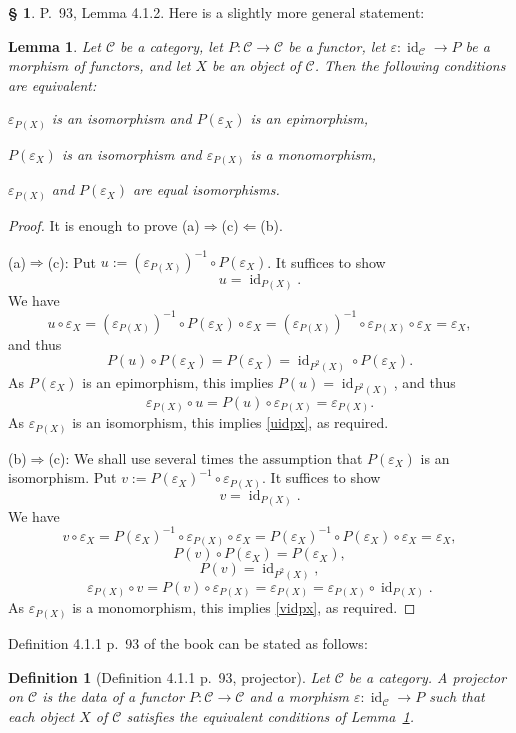 \documentclass[12pt]{article}
\newtheorem{lem}[thm]{Lemma}
\newtheorem{df}[thm]{Definition}
\theoremstyle{remark}
\theoremstyle{definition}
\newtheorem{s}[thm]{\S}
\newcommand{\nn}{\noindent}
\newcommand{\C}{\mathcal C}
\newcommand{\ee}{\varepsilon}
\newcommand{\then}{\Rightarrow}
\DeclareMathOperator{\id}{id}
\begin{document}
\begin{s}
P.~93, Lemma 4.1.2. Here is a slightly more general statement:

\begin{lem}\label{proj3}
Let $\C$ be a category, let $P:\C\to\C$ be a functor, let $\ee:\id_\C\to P$ be a morphism of functors, and let $X$ be an object of $\C$. Then the following conditions are equivalent:

\nn{\em(a)} $\ee_{P(X)}$ is an isomorphism and $P(\ee_X)$ is an epimorphism,

\nn{\em(b)} $P(\ee_X)$ is an isomorphism and $\ee_{P(X)}$ is a monomorphism,

\nn{\em(c)} $\ee_{P(X)}$ and $P(\ee_X)$ are equal isomorphisms.
\end{lem}

\begin{proof} It is enough to prove (a)$\then$(c)$\Leftarrow$(b). 

\nn(a)$\then$(c): Put $u:=(\ee_{P(X)})^{-1}\circ P(\ee_X)$. It suffices to show 
%
\begin{equation}\label{uidpx}
u=\id_{P(X)}.
\end{equation}
%
We have 
$$
u\circ\ee_X=(\ee_{P(X)})^{-1}\circ P(\ee_X)\circ\ee_X=(\ee_{P(X)})^{-1}\circ\ee_{P(X)}\circ\ee_X=\ee_X,
$$ 
and thus 
$$
P(u)\circ P(\ee_X)=P(\ee_X)=\id_{P^2(X)}\circ P(\ee_X).
$$
As $P(\ee_X)$ is an epimorphism, this implies $P(u)=\id_{P^2(X)}$, and thus 
$$
\ee_{P(X)}\circ u=P(u)\circ \ee_{P(X)}=\ee_{P(X)}.
$$ 
As $\ee_{P(X)}$ is an isomorphism, this implies \eqref{uidpx}, as required.

\nn(b)$\then$(c): We shall use several times the assumption that $P(\ee_X)$ is an isomorphism. Put $v:=P(\ee_X)^{-1}\circ\ee_{P(X)}$. It suffices to show 
%
\begin{equation}\label{vidpx}
v=\id_{P(X)}.
\end{equation}
%
We have 
$$
v\circ\ee_X=P(\ee_X)^{-1}\circ\ee_{P(X)}\circ\ee_X=P(\ee_X)^{-1}\circ P(\ee_X)\circ\ee_X=\ee_X,
$$ 
$$
P(v)\circ P(\ee_X)=P(\ee_X),
$$
$$
P(v)=\id_{P^2(X)},
$$
$$
\ee_{P(X)}\circ v=P(v)\circ\ee_{P(X)}=\ee_{P(X)}=\ee_{P(X)}\circ\id_{P(X)}.
$$ 
As $\ee_{P(X)}$ is a monomorphism, this implies \eqref{vidpx}, as required. 
\end{proof}

Definition 4.1.1 p.~93 of the book can be stated as follows:

\begin{df}[Definition 4.1.1 p.~93, projector] 
Let $\C$ be a category. A {\em projector} on $\C$ is the data of a functor $P:\C\to\C$ and a morphism $\ee:\id_\C\to P$ such that each object $X$ of $\C$ satisfies the equivalent conditions of Lemma~\ref{proj3}. 
\end{df}
\end{s}
\end{document}
